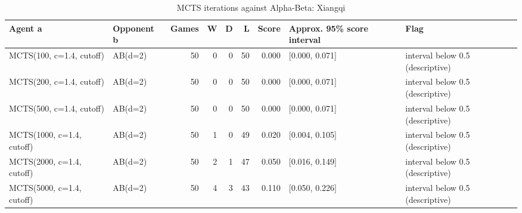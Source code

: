 \begin{table}[!t]
\centering
\caption{MCTS iterations against Alpha-Beta: Xiangqi}
\label{tab:ab_ladder_xiangqi}
\small
\begin{tabular}{llrrrrrll}
\toprule
Agent a & Opponent b & Games & W & D & L & Score & Approx. 95\% score interval & Flag \\
\midrule
MCTS(100, c=1.4, cutoff) & AB(d=2) & 50 & 0 & 0 & 50 & 0.000 & [0.000, 0.071] & interval below 0.5 (descriptive) \\
MCTS(200, c=1.4, cutoff) & AB(d=2) & 50 & 0 & 0 & 50 & 0.000 & [0.000, 0.071] & interval below 0.5 (descriptive) \\
MCTS(500, c=1.4, cutoff) & AB(d=2) & 50 & 0 & 0 & 50 & 0.000 & [0.000, 0.071] & interval below 0.5 (descriptive) \\
MCTS(1000, c=1.4, cutoff) & AB(d=2) & 50 & 1 & 0 & 49 & 0.020 & [0.004, 0.105] & interval below 0.5 (descriptive) \\
MCTS(2000, c=1.4, cutoff) & AB(d=2) & 50 & 2 & 1 & 47 & 0.050 & [0.016, 0.149] & interval below 0.5 (descriptive) \\
MCTS(5000, c=1.4, cutoff) & AB(d=2) & 50 & 4 & 3 & 43 & 0.110 & [0.050, 0.226] & interval below 0.5 (descriptive) \\
\bottomrule
\end{tabular}
\end{table}
